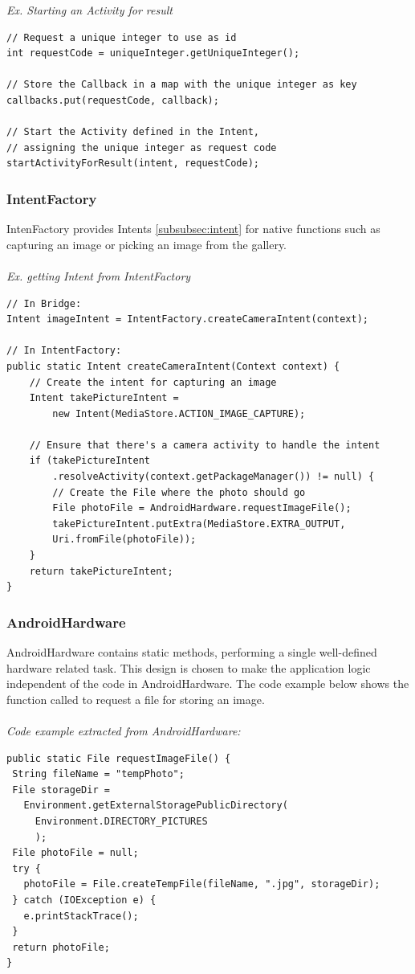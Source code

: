 \emph{Ex. Starting an Activity for result}
\begin{lstlisting}
// Request a unique integer to use as id
int requestCode = uniqueInteger.getUniqueInteger();

// Store the Callback in a map with the unique integer as key	
callbacks.put(requestCode, callback);
   
// Start the Activity defined in the Intent, 
// assigning the unique integer as request code
startActivityForResult(intent, requestCode);
\end{lstlisting}
	
\subsubsection{IntentFactory} 
IntenFactory provides Intents \ref{subsubsec:intent} for native functions such as capturing an image or picking an image from the gallery.
	\\\\
	\emph{Ex. getting Intent from IntentFactory}
	
	\begin{lstlisting}
// In Bridge:
Intent imageIntent = IntentFactory.createCameraIntent(context);
		
// In IntentFactory:
public static Intent createCameraIntent(Context context) {
	// Create the intent for capturing an image
	Intent takePictureIntent = 
		new Intent(MediaStore.ACTION_IMAGE_CAPTURE);
	
	// Ensure that there's a camera activity to handle the intent
	if (takePictureIntent
		.resolveActivity(context.getPackageManager()) != null) {
		// Create the File where the photo should go
		File photoFile = AndroidHardware.requestImageFile();
		takePictureIntent.putExtra(MediaStore.EXTRA_OUTPUT,
		Uri.fromFile(photoFile));
	}
	return takePictureIntent;
}
\end{lstlisting}
	
\subsubsection{AndroidHardware}
AndroidHardware contains static methods, performing a single well-defined hardware related task. This design is chosen to make the application logic independent of the code in AndroidHardware. The code example below shows the function called to request a file for storing an image.
	\\\\
	\emph{Code example extracted from AndroidHardware:}
\begin{lstlisting}
public static File requestImageFile() {
 String fileName = "tempPhoto";
 File storageDir = 
   Environment.getExternalStoragePublicDirectory(
     Environment.DIRECTORY_PICTURES
     );
 File photoFile = null;
 try {
   photoFile = File.createTempFile(fileName, ".jpg", storageDir);
 } catch (IOException e) {
   e.printStackTrace();
 }
 return photoFile;
}
\end{lstlisting}
	
